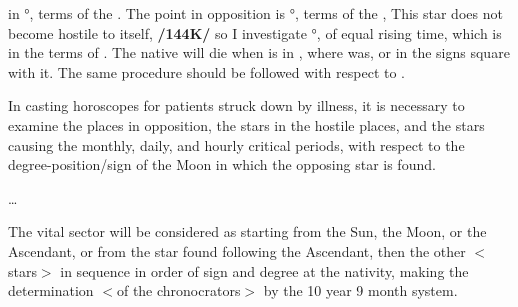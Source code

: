 \Venus\xspace in \Scorpio\xspace 27°, terms of the \Sun. The point in opposition is \Taurus\xspace 27°, terms of the \Sun,
This star does not become hostile to itself, \textbf{/144K/} so I investigate \Scorpio\xspace 27°, of equal rising time,
which is in the terms of \Mercury. The native will die when \Venus\xspace is in \Virgo, where \Mercury\xspace was, or in the signs square with it. The same procedure should be followed with respect to \Mercury.

In casting horoscopes for patients struck down by illness, it is necessary to examine the places in opposition, the stars in the hostile places, and the stars causing the monthly, daily, and hourly critical periods, with respect to the degree-position/sign of the Moon in which the opposing star is found.

\ldots

The vital sector will be considered as starting from the Sun, the Moon, or the Ascendant, or from the star found following the Ascendant, then the other $<$stars$>$ in sequence in order of sign and degree at the nativity, making the determination $<$of the chronocrators$>$ by the 10 year 9 month system.


\newpage